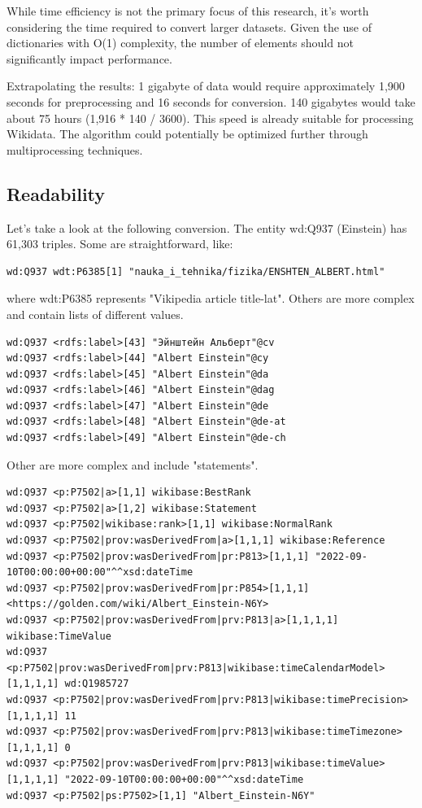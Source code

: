While time efficiency is not the primary focus of this research, it's worth considering the time required to convert larger datasets. Given the use of dictionaries with O(1) complexity, the number of elements should not significantly impact performance.

Extrapolating the results: 1 gigabyte of data would require approximately 1,900 seconds for preprocessing and 16 seconds for conversion. 140 gigabytes would take about 75 hours (1,916 * 140 / 3600). This speed is already suitable for processing Wikidata. The algorithm could potentially be optimized further through multiprocessing techniques.

\subsection{Readability}

Let's take a look at the following conversion. The entity wd:Q937 (Einstein) has 61,303 triples. Some are straightforward, like:

{\footnotesize
\begin{verbatim}
wd:Q937 wdt:P6385[1] "nauka_i_tehnika/fizika/ENSHTEN_ALBERT.html"
\end{verbatim}
}

where wdt:P6385 represents "Vikipedia article title-lat". Others are more complex and contain lists of different values.

{\footnotesize
\begin{verbatim}
wd:Q937 <rdfs:label>[43] "Эйнштейн Альберт"@cv
wd:Q937 <rdfs:label>[44] "Albert Einstein"@cy
wd:Q937 <rdfs:label>[45] "Albert Einstein"@da
wd:Q937 <rdfs:label>[46] "Albert Einstein"@dag
wd:Q937 <rdfs:label>[47] "Albert Einstein"@de
wd:Q937 <rdfs:label>[48] "Albert Einstein"@de-at
wd:Q937 <rdfs:label>[49] "Albert Einstein"@de-ch
\end{verbatim}
}

Other are more complex and include "statements".

{\footnotesize
\begin{verbatim}
wd:Q937 <p:P7502|a>[1,1] wikibase:BestRank
wd:Q937 <p:P7502|a>[1,2] wikibase:Statement
wd:Q937 <p:P7502|wikibase:rank>[1,1] wikibase:NormalRank
wd:Q937 <p:P7502|prov:wasDerivedFrom|a>[1,1,1] wikibase:Reference
wd:Q937 <p:P7502|prov:wasDerivedFrom|pr:P813>[1,1,1] "2022-09-10T00:00:00+00:00"^^xsd:dateTime
wd:Q937 <p:P7502|prov:wasDerivedFrom|pr:P854>[1,1,1] <https://golden.com/wiki/Albert_Einstein-N6Y>
wd:Q937 <p:P7502|prov:wasDerivedFrom|prv:P813|a>[1,1,1,1] wikibase:TimeValue
wd:Q937 <p:P7502|prov:wasDerivedFrom|prv:P813|wikibase:timeCalendarModel>[1,1,1,1] wd:Q1985727
wd:Q937 <p:P7502|prov:wasDerivedFrom|prv:P813|wikibase:timePrecision>[1,1,1,1] 11
wd:Q937 <p:P7502|prov:wasDerivedFrom|prv:P813|wikibase:timeTimezone>[1,1,1,1] 0
wd:Q937 <p:P7502|prov:wasDerivedFrom|prv:P813|wikibase:timeValue>[1,1,1,1] "2022-09-10T00:00:00+00:00"^^xsd:dateTime
wd:Q937 <p:P7502|ps:P7502>[1,1] "Albert_Einstein-N6Y"
\end{verbatim}
}

